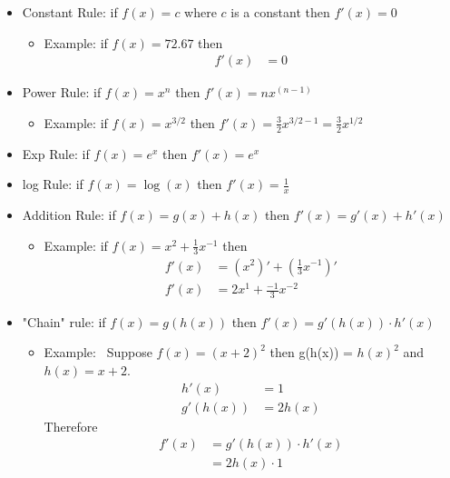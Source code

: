 \begin{itemize}
    \item Constant Rule: if $f(x) = c$ where $c$ is a constant  then $f'(x) = 0$
        \begin{itemize}
           \item Example: if $f(x) = 72.67  $ then 
           \begin{align}
               f'(x) &= 0
           \end{align}
       \end{itemize}
       
    \item Power Rule: if $f(x) = x^{n}$ then $f'(x) = nx^{(n-1)}$ 
       \begin{itemize}
           \item Example: if $f(x) = x^{3/2}$ then $f'(x) = \frac{3}{2}x^{3/2-1} = \frac{3}{2}x^{1/2} $
       \end{itemize}
    \item Exp Rule: if $f(x) = e^{x}$ then $f'(x) = e^{x}$
    \item log Rule: if $f(x) = \log(x)$ then $f'(x) = \frac{1}{x}$
    \item Addition Rule: if $f(x) = g(x) + h(x)$ then $f'(x) = g'(x) + h'(x)$
       \begin{itemize}
           \item Example: if $f(x) = x^{2} + \frac{1}{3} x^{-1} $ then 
           \begin{align}
               f'(x) &= \left(x^{2}\right)' + \left( \frac{1}{3} x^{-1} \right)'\\
               f'(x) &= 2x^{1} +  \frac{-1}{3} x^{-2}
           \end{align}
       \end{itemize}
    \item "Chain" rule: if $f(x) = g( h(x) )$ then $ f'(x) = g'(h(x)) \cdot h'(x)$
        \begin{itemize}
            \item Example:~ Suppose $f(x) = (x+2)^{2}$ then g(h(x)) = $h(x)^{2}$ and $h(x) = x+2$.
            \begin{align}
                h'(x) &= 1\\
                g'(h(x)) &= 2 h(x)
            \end{align}
            Therefore 
            \begin{align}
                f'(x) &= g'(h(x)) \cdot h'(x)\\
                      &= 2 h(x) \cdot 1\\

\end{align}
\end{itemize}
\end{itemize}
